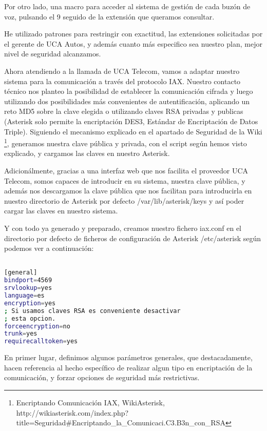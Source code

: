 Por otro lado, una macro para acceder al sistema de gestión de cada buzón de voz, pulsando el 9 seguido de la extensión que queramos consultar.

He utilizado patrones para restringir con exactitud, las extensiones solicitadas por el gerente de UCA Autos, y además cuanto más especifico sea nuestro plan, mejor nivel de seguridad alcanzamos.

Ahora atendiendo a la llamada de UCA Telecom, vamos a adaptar nuestro sistema para la comunicación a través del protocolo IAX. Nuestro contacto técnico nos planteo la posibilidad de establecer la comunicación cifrada y luego utilizando dos posibilidades más convenientes de autentificación, aplicando un reto MD5 sobre la clave elegida o utilizando claves RSA privadas y publicas (Asterisk solo permite la encriptación DES3, Estándar de Encriptación de Datos Triple). Siguiendo el mecanismo explicado en el apartado de Seguridad de la Wiki \footnote{Encriptando Comunicación IAX, WikiAsterisk, \\http://wikiasterisk.com/index.php?title=Seguridad\#Encriptando\_la\_Comunicaci.C3.B3n\_con\_RSA}, generamos nuestra clave pública y privada, con el script según hemos visto explicado, y cargamos las claves en nuestro Asterisk.

Adicionálmente, gracias a una interfaz web que nos facilita el proveedor UCA Telecom, somos capaces de introducir en su sistema, nuestra clave pública, y además nos descargamos la clave pública que nos facilitan para introducirla en nuestro directorio de Asterisk por defecto /var/lib/asterisk/keys y así poder cargar las claves en nuestro sistema.

Y con todo ya generado y preparado, creamos nuestro fichero iax.conf en el directorio por defecto de ficheros de configuración de Asterisk /etc/asterisk según podemos ver a continuación:

\begin{lstlisting}[language=bash,title={/etc/asterisk/iax.conf}]

[general]
bindport=4569
srvlookup=yes
language=es
encryption=yes
; Si usamos claves RSA es conveniente desactivar 
; esta opcion.
forceencryption=no
trunk=yes
requirecalltoken=yes

\end{lstlisting}

En primer lugar, definimos algunos parámetros generales, que destacadamente, hacen referencia al hecho específico de realizar algun tipo en encriptación de la comunicación, y forzar opciones de seguridad más restrictivas.

